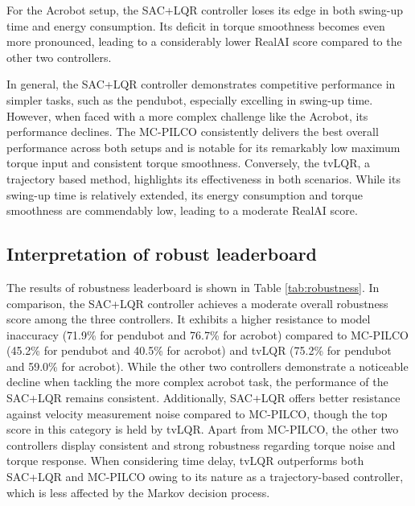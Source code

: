 For the Acrobot setup, the SAC+LQR controller loses its edge in both swing-up time and energy consumption. Its deficit in torque smoothness becomes even more pronounced, leading to a considerably lower RealAI score compared to the other two controllers.

In general, the SAC+LQR controller demonstrates competitive performance in simpler tasks, such as the pendubot, especially excelling in swing-up time. However, when faced with a more complex challenge like the Acrobot, its performance declines. The MC-PILCO consistently delivers the best overall performance across both setups and is notable for its remarkably low maximum torque input and consistent torque smoothness. Conversely, the tvLQR, a trajectory based method, highlights its effectiveness in both scenarios. While its swing-up time is relatively extended, its energy consumption and torque smoothness are commendably low, leading to a moderate RealAI score.

\subsection{Interpretation of robust leaderboard}
The results of robustness leaderboard is shown in Table \ref{tab:robustness}. In comparison, the SAC+LQR controller achieves a moderate overall robustness score among the three controllers. It exhibits a higher resistance to model inaccuracy (71.9\% for pendubot and 76.7\% for acrobot) compared to MC-PILCO (45.2\% for pendubot and 40.5\% for acrobot) and tvLQR (75.2\% for pendubot and 59.0\% for acrobot). While the other two controllers demonstrate a noticeable decline when tackling the more complex acrobot task, the performance of the SAC+LQR remains consistent. Additionally, SAC+LQR offers better resistance against velocity measurement noise compared to MC-PILCO, though the top score in this category is held by tvLQR. Apart from MC-PILCO, the other two controllers display consistent and strong robustness regarding torque noise and torque response. When considering time delay, tvLQR outperforms both SAC+LQR and MC-PILCO owing to its nature as a trajectory-based controller, which is less affected by the Markov decision process.

